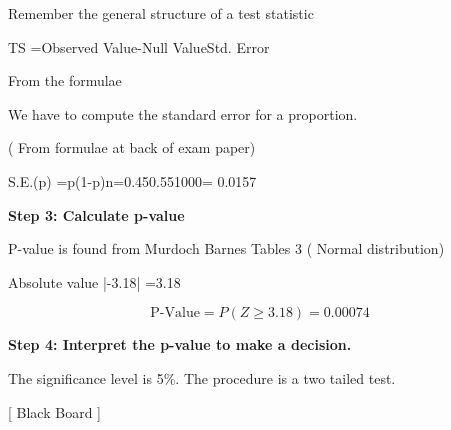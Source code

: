 Remember the general structure of a test statistic

TS =Observed Value-Null ValueStd. Error 



From the formulae

We have to compute the standard error for a proportion. 

( From formulae at back of exam paper)

S.E.(p) =p(1-p)n=0.450.551000= 0.0157




\noindent \textbf{Step 3: Calculate p-value}

P-value is found from Murdoch Barnes Tables 3 ( Normal distribution)

Absolute value  |-3.18| =3.18




\[ \mbox{P-Value} = P(Z \geq 3.18) = 0.00074\]


\noindent \textbf{Step 4: Interpret the p-value to make a decision.}

The significance level is 5\%.  The procedure is a two tailed test.


[ Black Board ]



